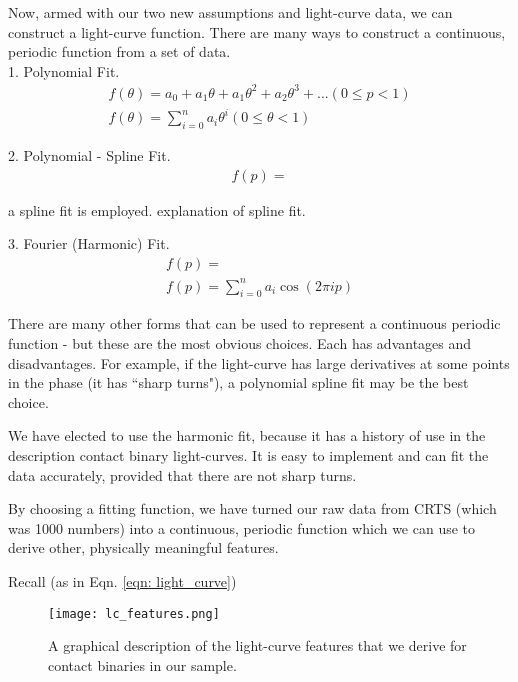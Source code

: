 \documentclass[12pt]{article} %
\numberwithin{equation}{section} %
\begin{document}
Now, armed with our two new assumptions and light-curve data, we can construct a light-curve function. There are many ways to construct a continuous, periodic function from a set of data. \\

1. Polynomial Fit. \\

\begin{multline} \label{eqn: polynomial_fit}
f(\theta) = a_{0} + a_{1}\theta + a_{1}\theta^{2} + a_{2}\theta^{3} + ... (0 \leq p < 1) \\
f(\theta) = \sum_{i = 0}^{n} a_{i}\theta^{i}  (0 \leq \theta < 1)
\end{multline}

2. Polynomial - Spline Fit. \\

\begin{multline} \label{eqn: spline_fit} 
f(p) = 
\end{multline}

\citep{gettel2006catalog} a spline fit is employed. \citep{akerlof1994application} explanation of spline fit.

3. Fourier (Harmonic) Fit. \\

\begin{multline} \label{eqn: harmonic_fit} 
f(p) =  \\
f(p) = \sum_{i = 0}^{n} a_{i} \cos(2 \pi i p)
\end{multline}

There are many other forms that can be used to represent a continuous periodic function - but these are the most obvious choices. Each has advantages and disadvantages. For example, if the light-curve has large derivatives at some points in the phase (it has ``sharp turns"), a polynomial spline fit may be the best choice.

We have elected to use the harmonic fit, because it has a history of use in the description contact binary light-curves. It is easy to implement and can fit the data accurately, provided that there are not sharp turns.

By choosing a fitting function, we have turned our raw data from CRTS (which was 1000 numbers) into a continuous, periodic function which we can use to derive other, physically meaningful features.

Recall (as in Eqn. \ref{eqn: light_curve}) 

\begin{figure}[H]
\centering
\texttt{[image: lc\_features.png]}
\caption{A graphical description of the light-curve features that we derive for contact binaries in our sample.}
\label{fig: lc_features}
\end{figure}
\end{document}
